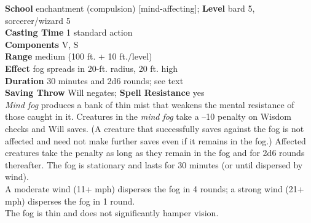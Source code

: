 \textbf{School} enchantment (compulsion) [mind-affecting]; \textbf{Level} bard 5, sorcerer/wizard 5\\
\textbf{Casting Time} 1 standard action\\
\textbf{Components} V, S\\
\textbf{Range }medium (100 ft. + 10 ft./level)\\
\textbf{Effect} fog spreads in 20-ft. radius, 20 ft. high\\
\textbf{Duration} 30 minutes and 2d6 rounds; see text\\
\textbf{Saving Throw }Will negates; \textbf{Spell Resistance} yes\\
\textit{Mind fog }produces a bank of thin mist that weakens the mental resistance of those caught in it. Creatures in the \textit{mind fog }take a --10 penalty on Wisdom checks and Will saves. (A creature that successfully saves against the fog is not affected and need not make further saves even if it remains in the fog.) Affected creatures take the penalty as long as they remain in the fog and for 2d6 rounds thereafter. The fog is stationary and lasts for 30 minutes (or until dispersed by wind).\\
A moderate wind (11+ mph) disperses the fog in 4 rounds; a strong wind (21+ mph) disperses the fog in 1 round.\\
The fog is thin and does not significantly hamper vision.\\
